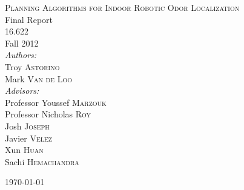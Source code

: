 \begin{titlepage}

\begin{center}

\vspace*{3cm}

\textsc{{\Huge Planning Algorithms for Indoor Robotic Odor Localization}}\\[3cm]

{\Large Final Report}\\
{\large 16.622}\\
{\large Fall 2012}\\
[1.5cm]

\emph{Authors:}\\
Troy \textsc{Astorino}\\
Mark \textsc{Van de Loo}\\
[1.5cm]

\emph{Advisors:}\\
Professor Youssef \textsc{Marzouk}\\
Professor Nicholas \textsc{Roy}\\
Josh \textsc{Joseph}\\
Javier \textsc{Velez}\\
Xun \textsc{Huan}\\
Sachi \textsc{Hemachandra}

\end{center}
\vfill

\today
\end{titlepage}